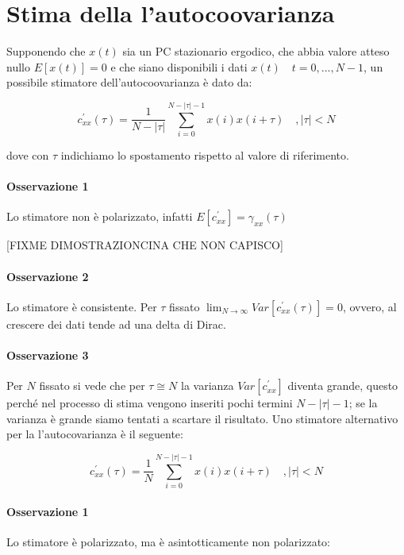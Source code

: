 \section{Stima della l'autocoovarianza}
Supponendo che $x(t)$ sia un PC stazionario ergodico, che abbia valore atteso nullo $E[x(t)]=0$ e che siano disponibili i dati $x(t) \quad t=0,...,N-1$, un possibile stimatore dell'autocoovarianza è dato da:

  \[ c_{xx}^{'}(\tau)=\frac{1}{N-|\tau |}\sum_{i=0}^{N-|\tau |-1}{x(i)x(i+\tau )} \quad, |\tau |<N \]
  
\noindent dove con $\tau$ indichiamo lo spostamento rispetto al valore di riferimento.
\paragraph{Osservazione 1} Lo stimatore non è polarizzato, infatti $E[c_{xx}^{'}]=\gamma_{xx}(\tau)$

\begin{center}[FIXME DIMOSTRAZIONCINA CHE NON CAPISCO]\end{center}

\paragraph{Osservazione 2} Lo stimatore è consistente. Per $\tau$ fissato $\lim_{N\rightarrow\infty}{Var[c_{xx}^{'}(\tau )]}=0$, ovvero, al crescere dei dati tende ad una delta di Dirac.
\paragraph{Osservazione 3} Per $N$ fissato si vede che per $\tau\cong N$ la varianza $Var[c_{xx}^{'}]$ diventa grande, questo perché nel processo di stima vengono inseriti pochi termini $N-|\tau|-1$; se la varianza è grande siamo tentati a scartare il risultato.\newline\newline
Uno stimatore alternativo per la l'autocovarianza è il seguente:

  \[ c_{xx}^{'}(\tau)=\frac{1}{N}\sum_{i=0}^{N-|\tau |-1}{x(i)x(i+\tau )} \quad, |\tau |<N \]
  
\paragraph{Osservazione 1} Lo stimatore è polarizzato, ma è asintotticamente non polarizzato:

